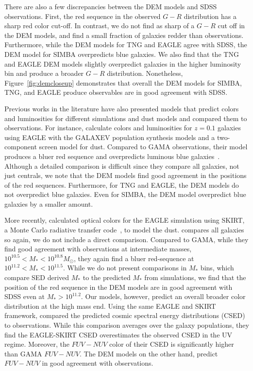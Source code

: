 There are also a few discrepancies between the DEM models and SDSS observations. 
First, the red sequence in the observed $G-R$ distribution has a sharp red color 
cut-off.  In contrast, we do not find as sharp of a $G-R$ cut off in the DEM models, 
and find a small fraction of galaxies redder than observations. 
Furthermore, while the DEM models for TNG and EAGLE agree with SDSS, the DEM
model for SIMBA overpredicts blue galaxies.  We also find that the TNG and EAGLE DEM models slightly overpredict 
galaxies in the higher luminosity bin and produce a broader $G-R$ distribution.
Nonetheless, Figure~\ref{fig:demcloseup} demonstrates that overall the DEM
models for SIMBA, TNG, and EAGLE produce observables are in good agreement 
with SDSS.

Previous works in the literature have also presented models that predict colors
and luminosities for different simulations and dust models and compared them to
observations. For instance, \cite{trayford2015} calculate colors and luminosities 
for $z=0.1$ galaxies using EAGLE with the {\sc GALAXEV} population synthesis models 
and a two-component screen model for dust. Compared to GAMA observations, their
model produces a bluer red sequence and overpredicts luminous blue galaxies~\citep[][Figure
5]{trayford2015}. Although a detailed comparison is difficult since they
compare all galaxies, not just centrals, we note that the DEM models find good
agreement in the positions of the red sequences. Furthermore, for TNG and EAGLE, 
the DEM models do not overpredict blue galaxies. Even for SIMBA, the DEM model
overpredict blue galaxies by a smaller amount.

More recently, \cite{trayford2017} calculated optical colors for the EAGLE simulation using
{\sc SKIRT}, a Monte Carlo radiative transfer code~\citep{camps2015}, to model the dust. 
\cite{trayford2017} compares all galaxies so again, we do not include a direct 
comparison. Compared to GAMA, while they find good agreement with observations 
at intermediate masses, $10^{10.5} < M_* < 10^{10.8} M_\odot$, they again find
a bluer red-sequence at $10^{11.2} < M_* < 10^{11.5}$. While we do not present
comparisons in $M_*$ bins, which compare SED derived $M_*$ to the predicted
$M_*$ from simulations, we find that the position of the red sequence in the
DEM models are in good agreement with SDSS even at $M_* > 10^{11.2}$. Our models, 
however, predict an overall broader color distribution at the high mass end. 
Using the same \cite{trayford2017} EAGLE and {\sc SKIRT} framework,
\cite{baes2019} compared the predicted cosmic spectral energy distributions
(CSED) to observations. While this comparison averages over the galaxy
populations, they find the EAGLE-{\sc SKIRT} CSED overestimates the observed
CSED in the UV regime. Moreover, the $FUV-NUV$ color of their CSED is
significantly higher than GAMA $FUV-NUV$. The DEM models on the other hand, 
predict $FUV-NUV$ in good agreement with observations. 

